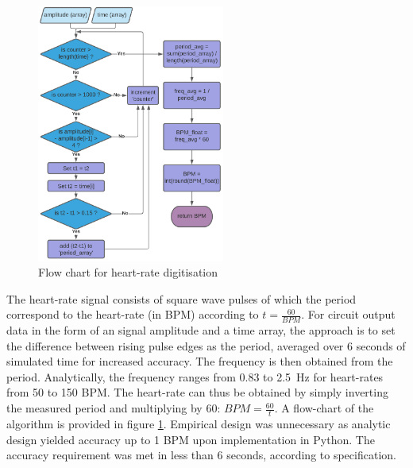 \begin{figure}
	\centering
	\vspace{-0.5cm}
	\includegraphics[width=0.55\textwidth]{./Figures/pseudo}
	\caption{Flow chart for heart-rate digitisation}
	\label{fig:algo}
\end{figure}

The heart-rate signal consists of square wave pulses of which the period correspond to the heart-rate (in BPM) according to $t = \frac{60}{BPM}$. For circuit output data in the form of an signal amplitude and a time array, the approach is to set the difference between rising pulse edges as the period, averaged over 6 seconds of simulated time for increased accuracy. The frequency is then obtained from the period. Analytically, the frequency ranges from 0.83 to \SI{2.5}{Hz} for heart-rates from 50 to 150 BPM. The heart-rate can thus be obtained by simply inverting the measured period and multiplying by 60: $BPM = \frac{60}{t}$. A flow-chart of the algorithm is provided in figure \ref{fig:algo}. Empirical design was unnecessary as analytic design yielded accuracy up to 1 BPM upon implementation in Python. The accuracy requirement was met in less than 6 seconds, according to specification. 

